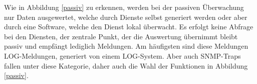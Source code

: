 Wie in Abbildung \ref{passiv} zu erkennen, werden bei der passiven Überwachung nur Daten
ausgewertet, welche durch Dienste selbst generiert werden oder aber durch eine Software, 
welche den Dienst lokal überwacht. Es erfolgt keine Abfrage bei den Diensten, der 
zentrale Punkt, der die Auswertung übernimmt bleibt passiv und empfängt lediglich 
Meldungen. Am häufigsten sind diese Meldungen LOG-Meldungen, generiert von einem 
LOG-System. Aber auch SNMP-Traps fallen unter diese Kategorie, daher auch die Wahl der 
Funktionen in Abbildung \ref{passiv}.